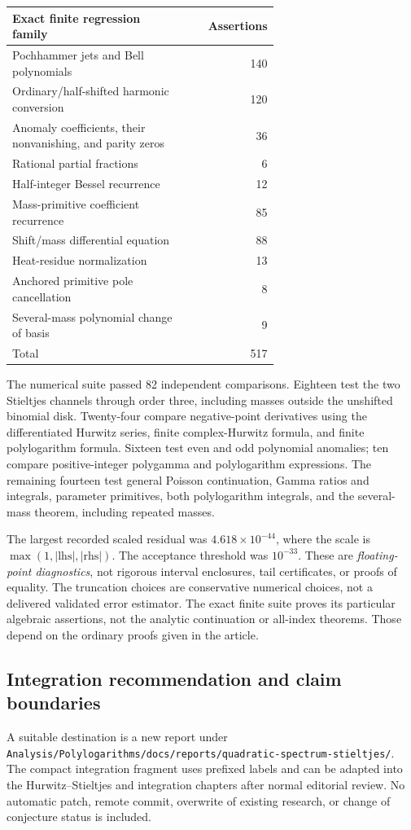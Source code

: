 \documentclass[11pt,letterpaper]{article}
\numberwithin{equation}{section}
\theoremstyle{definition}
\newcommand{\qfile}[1]{\nolinkurl{#1}}
\begin{document}
\begin{center}
\begin{tabular}{@{}p{0.65\linewidth}r@{}}
\toprule
Exact finite regression family & Assertions\\
\midrule
Pochhammer jets and Bell polynomials & 140\\
Ordinary/half-shifted harmonic conversion & 120\\
Anomaly coefficients, their nonvanishing, and parity zeros & 36\\
Rational partial fractions & 6\\
Half-integer Bessel recurrence & 12\\
Mass-primitive coefficient recurrence & 85\\
Shift/mass differential equation & 88\\
Heat-residue normalization & 13\\
Anchored primitive pole cancellation & 8\\
Several-mass polynomial change of basis & 9\\
\midrule
Total & 517\\
\bottomrule
\end{tabular}
\end{center}

The numerical suite passed 82 independent comparisons. Eighteen test the
two Stieltjes channels through order three, including masses outside the
unshifted binomial disk. Twenty-four compare negative-point derivatives
using the differentiated Hurwitz series, finite complex-Hurwitz formula,
and finite polylogarithm formula. Sixteen test even and odd polynomial
anomalies; ten compare positive-integer polygamma and polylogarithm
expressions. The remaining fourteen test general Poisson continuation,
Gamma ratios and integrals, parameter primitives, both polylogarithm
integrals, and the several-mass theorem, including repeated masses.

The largest recorded scaled residual was
$4.618\times10^{-44}$, where the scale is
$\max(1,|\mathrm{lhs}|,|\mathrm{rhs}|)$. The acceptance threshold was
$10^{-33}$. These are \emph{floating-point diagnostics}, not rigorous
interval enclosures, tail certificates, or proofs of equality. The
truncation choices are conservative numerical choices, not a delivered
validated error estimator. The exact finite suite proves its particular
algebraic assertions, not the analytic continuation or all-index theorems.
Those depend on the ordinary proofs given in the article.

\subsection{Integration recommendation and claim boundaries}
A suitable destination is a new report under
\qfile{Analysis/Polylogarithms/docs/reports/quadratic-spectrum-stieltjes/}.
The compact integration fragment uses prefixed labels and can be adapted
into the Hurwitz--Stieltjes and integration chapters after normal editorial
review. No automatic patch, remote commit, overwrite of existing research,
or change of conjecture status is included.
\end{document}
